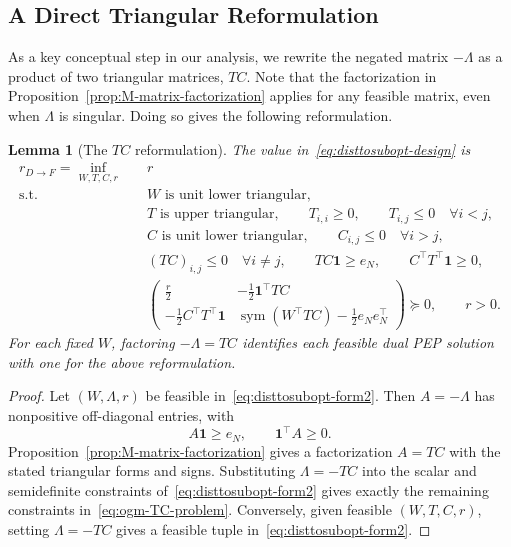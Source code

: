 \documentclass[11pt]{article}
\newtheorem{lemma}[thm]{Lemma}
\begin{document}
\subsection{A Direct Triangular Reformulation}

As a key conceptual step in our analysis, we rewrite the negated matrix $-\Lambda$ as a product of two triangular matrices, $TC$. Note that the factorization in Proposition~\ref{prop:M-matrix-factorization} applies for any feasible matrix, even when $\Lambda$ is singular. Doing so gives the following reformulation.

\begin{lemma}[The $TC$ reformulation]\label{lem:ogm-TC}
The value in~\eqref{eq:disttosubopt-design} is
\begin{equation}\label{eq:ogm-TC-problem}
\begin{aligned}
 r_{D\rightarrow F}
 =\inf_{W,T,C,r}\quad &r\\
 \mathrm{s.t.}\quad
 &W\text{ is unit lower triangular},\\
 &T\text{ is upper triangular},\qquad T_{i,i}\geq0,\qquad T_{i,j}\leq0 \quad\forall i<j,\\
 &C\text{ is unit lower triangular},\qquad C_{i,j}\leq0\quad \forall i>j,\\
 &(TC)_{i,j}\leq0\quad \forall i\neq j,\qquad TC\mathbf 1\geq e_N,
 \qquad C^\top T^\top\mathbf 1\geq0,\\
 &\begin{pmatrix}
       \frac r2 &-\frac12\mathbf 1^\top TC\\[1mm]
       -\frac12C^\top T^\top\mathbf 1
       &\operatorname{sym}(W^\top TC)-\frac12e_Ne_N^\top
   \end{pmatrix}\succeq0, \qquad r>0.
\end{aligned}
\end{equation}
For each fixed $W$, factoring $-\Lambda=TC$ identifies each feasible dual PEP solution with one for the above reformulation.
\end{lemma}

\begin{proof}
Let $(W,\Lambda,r)$ be feasible in~\eqref{eq:disttosubopt-form2}. Then
$A=-\Lambda$ has nonpositive off-diagonal entries, with
\[
    A\mathbf1\geq e_N,
    \qquad
    \mathbf1^\top A\geq0.
\]
Proposition~\ref{prop:M-matrix-factorization} gives a factorization $A=TC$
with the stated triangular forms and signs. Substituting $\Lambda=-TC$ into
the scalar and semidefinite constraints of~\eqref{eq:disttosubopt-form2}
gives exactly the remaining constraints in~\eqref{eq:ogm-TC-problem}.
Conversely, given feasible $(W,T,C,r)$, setting $\Lambda=-TC$ gives a
feasible tuple in~\eqref{eq:disttosubopt-form2}. 
\end{proof}
\end{document}
